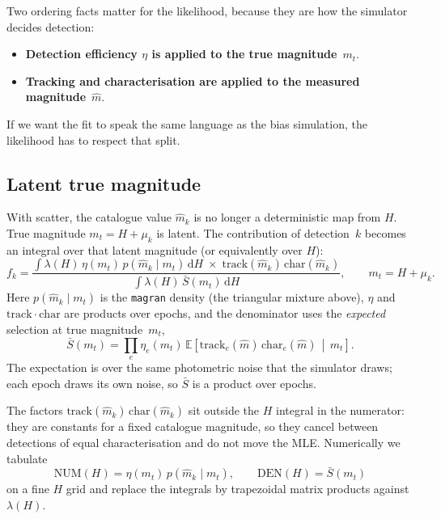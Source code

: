 \documentclass[11pt,a4paper]{article}
\begin{document}
Two ordering facts matter for the likelihood, because they are how the
simulator decides detection:

\begin{itemize}
  \item \textbf{Detection efficiency $\eta$ is applied to the true
  magnitude}~$m_t$.
  \item \textbf{Tracking and characterisation are applied to the measured
  magnitude}~$\hat m$.
\end{itemize}

If we want the fit to speak the same language as the bias simulation, the
likelihood has to respect that split.

\subsection{Latent true magnitude}

With scatter, the catalogue value $\hat m_k$ is no longer a deterministic map
from $H$.  True magnitude $m_t = H + \mu_k$ is latent.  The contribution of
detection~$k$ becomes an integral over that latent magnitude (or equivalently
over $H$):
\begin{equation}
  f_k
  = \frac{
      \displaystyle\int
        \lambda(H)\,
        \eta(m_t)\,
        p(\hat m_k \mid m_t)\,
        \mathrm{d}H
        \;\times\;
        \mathrm{track}(\hat m_k)\,\mathrm{char}(\hat m_k)
    }{
      \displaystyle\int
        \lambda(H)\,
        \bar S(m_t)\,
        \mathrm{d}H
    },
  \qquad m_t = H + \mu_k.
  \label{eq:fk-phot}
\end{equation}
Here $p(\hat m_k\mid m_t)$ is the \texttt{magran} density (the triangular
mixture above), $\eta$ and $\mathrm{track}\cdot\mathrm{char}$ are products
over epochs, and the denominator uses the \emph{expected} selection at true
magnitude~$m_t$,
\begin{equation}
  \bar S(m_t)
  = \prod_e \eta_e(m_t)\,
    \mathbb{E}\!\left[\mathrm{track}_e(\hat m)\,\mathrm{char}_e(\hat m)
      \,\middle|\, m_t\right].
  \label{eq:sbar}
\end{equation}
The expectation is over the same photometric noise that the simulator draws;
each epoch draws its own noise, so $\bar S$ is a product over epochs.

The factors $\mathrm{track}(\hat m_k)\,\mathrm{char}(\hat m_k)$ sit outside
the $H$ integral in the numerator: they are constants for a fixed catalogue
magnitude, so they cancel between detections of equal characterisation and do
not move the MLE.  Numerically we tabulate
\begin{equation}
  \mathrm{NUM}(H) = \eta(m_t)\,p(\hat m_k\mid m_t),
  \qquad
  \mathrm{DEN}(H) = \bar S(m_t)
\end{equation}
on a fine $H$ grid and replace the integrals by trapezoidal matrix products
against $\lambda(H)$.
\end{document}
